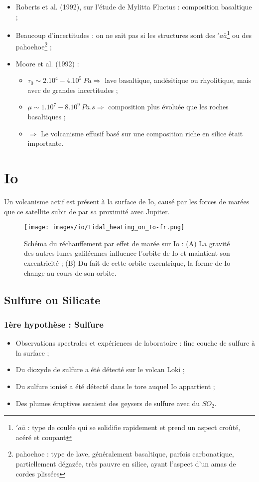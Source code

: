 \documentclass[10pt,a4paper, twocolumns]{article}
\begin{document}
	\begin{itemize}
		\item Roberts et al. (1992), sur l'étude de Mylitta Fluctus : composition basaltique ;
		\item Beaucoup d'incertitudes : on ne sait pas si les structures sont des $'a\bar{a}$\footnote{$'a\bar{a}$ : type de coulée qui se solidifie rapidement et prend un aspect croûté, acéré et coupant} ou des pahoehoe\footnote{pahoehoe : type de lave, généralement basaltique, parfois carbonatique, partiellement dégazée, très pauvre en silice, ayant l'aspect d'un amas de cordes plissées} ;
		\item Moore et al. (1992) :
		\begin{itemize}
			\item $\tau_0 \sim 2.10^4-4.10^5\ Pa \Rightarrow$ lave basaltique, andésitique ou rhyolitique, mais avec de grandes incertitudes ;
			\item $\mu \sim 1.10^7 - 8.10^9\ Pa.s \Rightarrow$ composition plus évoluée que les roches basaltiques ;
			\item $\Rightarrow$ Le volcanisme effusif basé sur une composition riche en silice était importante.
		\end{itemize}
	\end{itemize}

\section{Io}

Un volcanisme actif est présent à la surface de Io, causé par les forces de marées que ce satellite subit de par sa proximité avec Jupiter.

\begin{figure}[!h]
	\centering
	\texttt{[image: images/io/Tidal\_heating\_on\_Io-fr.png]}
	\caption{
Schéma du réchauffement par effet de marée sur Io : (A) La gravité des autres lunes galiléennes influence l'orbite de Io et maintient son excentricité ; (B) Du fait de cette orbite excentrique, la forme de Io change au cours de son orbite.}
\end{figure}

\subsection{Sulfure ou Silicate}

	\subsubsection{1ère hypothèse : Sulfure}
		\begin{itemize}
			\item Observations spectrales et expériences de laboratoire : fine couche de sulfure à la surface ;
			\item Du dioxyde de sulfure a été détecté sur le volcan Loki ;
			\item Du sulfure ionisé a été détecté dans le tore auquel Io appartient ;
			\item Des plumes éruptives seraient des geysers de sulfure avec du $SO_2$.
		\end{itemize}
	
\end{document}
